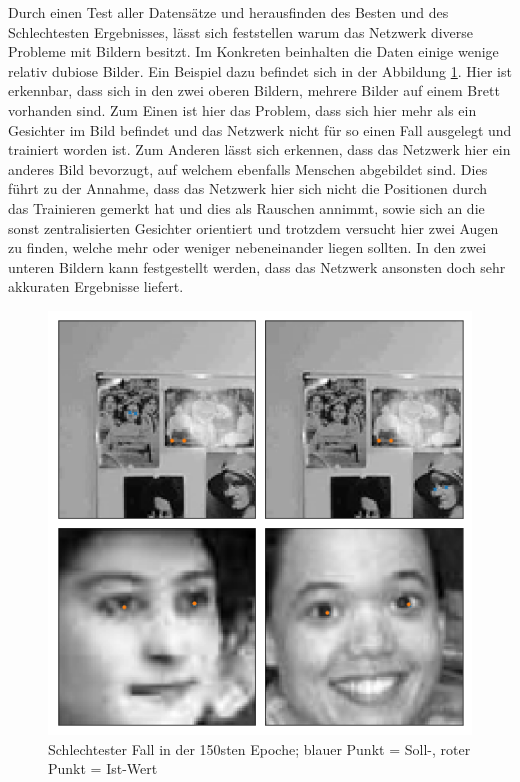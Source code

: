 \noindent
Durch einen Test aller Datensätze und herausfinden des Besten und des Schlechtesten Ergebnisses, lässt sich feststellen warum das Netzwerk diverse Probleme mit Bildern besitzt. 
Im Konkreten beinhalten die Daten einige wenige relativ dubiose Bilder. 
Ein Beispiel dazu befindet sich in der Abbildung \ref{fig:dubio}. 
Hier ist erkennbar, dass sich in den zwei oberen Bildern, mehrere Bilder auf einem Brett vorhanden sind. 
Zum Einen ist hier das Problem, dass sich hier mehr als ein Gesichter im Bild befindet und das Netzwerk nicht für so einen Fall ausgelegt und trainiert worden ist. 
Zum Anderen lässt sich erkennen, dass das Netzwerk hier ein anderes Bild bevorzugt, auf welchem ebenfalls Menschen abgebildet sind. 
Dies führt zu der Annahme, dass das Netzwerk hier sich nicht die Positionen durch das Trainieren gemerkt hat und dies als Rauschen annimmt, sowie sich an die sonst zentralisierten Gesichter orientiert und trotzdem versucht hier zwei Augen zu finden, welche mehr oder weniger nebeneinander liegen sollten. 
In den zwei unteren Bildern kann festgestellt werden, dass das Netzwerk ansonsten doch sehr akkuraten Ergebnisse liefert. 
\begin{figure}[ht!]
	\centering
	\includegraphics[scale=0.6]{images/Bad_2.png}
	\caption{Schlechtester Fall in der 150sten Epoche; blauer Punkt = Soll-, roter Punkt = Ist-Wert}
	\label{fig:dubio}
\end{figure} \phantom \newline

